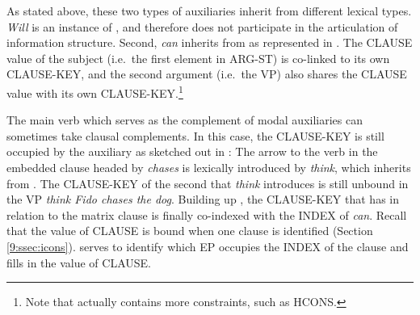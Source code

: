 \noindent As stated above, these two types of auxiliaries inherit from
different lexical types. \textit{Will} is an instance of
, and therefore does not participate in the
articulation of information structure. Second, \textit{can} inherits
from  as represented 
in . 
The CLAUSE value of
the subject (i.e.\ the first element in ARG-ST) is co-linked to its
own CLAUSE-KEY, and the second argument
(i.e.\ the VP) also shares the CLAUSE value with its own
CLAUSE-KEY.\footnote{Note that
   actually contains
  more constraints, such as HCONS.}





The main verb which serves as the complement of modal auxiliaries can
sometimes take clausal complements. In
this case, the CLAUSE-KEY is still occupied by the auxiliary as
sketched out in : The
arrow to the verb in the embedded clause headed by \textit{chases} is
lexically introduced by \textit{think}, which inherits from
. The CLAUSE-KEY of the second 
that \textit{think} introduces is still unbound in the VP
\textit{think Fido chases the dog}. Building up
, the CLAUSE-KEY that  has in
relation to the matrix clause is finally co-indexed with the INDEX of
\textit{can}. Recall that the value of CLAUSE is bound when one clause
is identified (Section \ref{9:ssec:icons}).  serves to
identify which EP occupies the INDEX of the clause and fills in the
value of CLAUSE.









